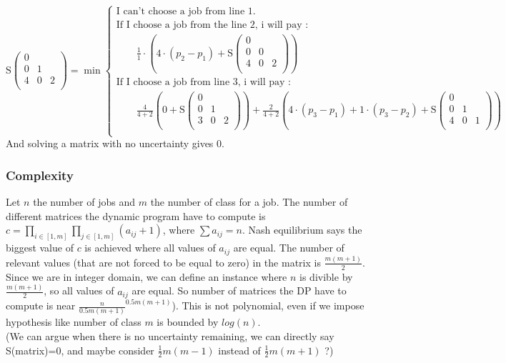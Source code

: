 \documentclass{article}
\begin{document}
$$
\text{S} \begin{pmatrix}
            0 &   &   \\
            0 & 1 &   \\ 
            4 & 0 & 2 \\
        \end{pmatrix} = \min \begin{cases}
        \text{I can't choose a job from line 1.}\\
        \text{If I choose a job from the line 2, i will pay :}\\
            \hspace{2em}\frac{1}{1}\cdot\left(4\cdot\left(p_2-p_1\right)+ \text{S}\begin{pmatrix}0 &   &   \\0 & 0 &   \\ 4 & 0 & 2 \\ \end{pmatrix}\right) \\ 
        \text{If I choose a job from line 3, i will pay :}\\
            \hspace{2em}\frac{4}{4+2}\left(0+\text{S} \begin{pmatrix}
            0 &   &   \\
            0 & 1 &   \\ 
            3 & 0 & 2 \\
        \end{pmatrix}\right) + \frac{2}{4+2}\left(4\cdot\left(p_3-p_1\right)+1\cdot\left(p_3-p_2\right)+\text{S} \begin{pmatrix}
            0 &   &   \\
            0 & 1 &   \\ 
            4 & 0 & 1 \\
        \end{pmatrix}\right) \\
        \end{cases}
$$
And solving a matrix with no uncertainty gives 0.

\subsubsection*{Complexity}
Let $n$ the number of jobs and $m$ the number of class for a job. The number of different matrices the dynamic program have to compute is $c=\prod_{i\in[1,m]}\prod_{j\in[1,m]}\left(a_{ij}+1\right)$, where $\sum a_{ij}=n$. Nash equilibrium says the biggest value of $c$ is achieved where all values of $a_{ij}$ are equal. The number of relevant values (that are not forced to be equal to zero) in the matrix is $\frac{m(m+1)}{2}$. Since we are in integer domain, we can define an instance where $n$ is divible by $\frac{m(m+1)}{2}$, so all values of $a_{ij}$ are equal. So number of matrices the DP have to compute is near $\frac{n}{0.5m(m+1)}^{0.5m(m+1)}$). This is not polynomial, even if we impose hypothesis like number of class $m$ is bounded by $log(n)$.\\
(We can argue when there is no uncertainty remaining, we can directly say S(matrix)=0, and maybe consider $\frac{1}{2}m(m-1)$ instead of $\frac{1}{2}m(m+1)$ ?)
\end{document}
